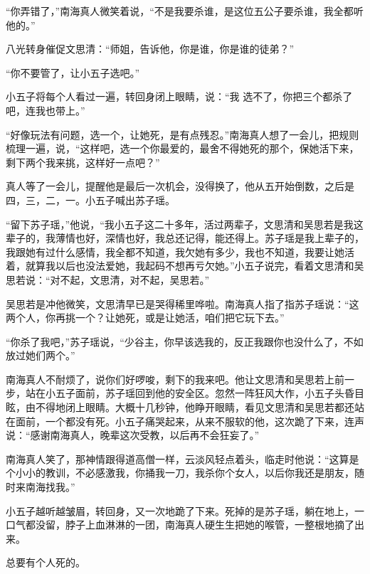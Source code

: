“你弄错了，”南海真人微笑着说，“不是我要杀谁，是这位五公子要杀谁，我全都听他的。”

八光转身催促文思清：“师姐，告诉他，你是谁，你是谁的徒弟？”

“你不要管了，让小五子选吧。”

小五子将每个人看过一遍，转回身闭上眼睛，说：“我
选不了，你把三个都杀了吧，连我也带上。”

“好像玩法有问题，选一个，让她死，是有点残忍。”南海真人想了一会儿，把规则梳理一遍，说，“这样吧，选一个你最爱的，最舍不得她死的那个，保她活下来，剩下两个我来挑，这样好一点吧？”

真人等了一会儿，提醒他是最后一次机会，没得换了，他从五开始倒数，之后是四，三，二，一。小五子喊出苏子瑶。

“留下苏子瑶，”他说，“我小五子这二十多年，活过两辈子，文思清和吴思若是我这辈子的，我薄情也好，深情也好，我总还记得，能还得上。苏子瑶是我上辈子的，我跟她有过什么感情，我全都不知道，我欠她有多少，我也不知道，我要让她活着，就算我以后也没法爱她，我起码不想再亏欠她。”小五子说完，看着文思清和吴思若说：“对不起，文思清，对不起，吴思若。”

吴思若是冲他微笑，文思清早已是哭得稀里哗啦。南海真人指了指苏子瑶说：“这两个人，你再挑一个？让她死，或是让她活，咱们把它玩下去。”

“你杀了我吧，”苏子瑶说，“少谷主，你早该选我的，反正我跟你也没什么了，不如放过她们两个。”

南海真人不耐烦了，说你们好啰唆，剩下的我来吧。他让文思清和吴思若上前一步，站在小五子面前，苏子瑶回到他的安全区。忽然一阵狂风大作，小五子头昏目眩，由不得地闭上眼睛。大概十几秒钟，他睁开眼睛，看见文思清和吴思若都还站在面前，一个都没有死。小五子痛哭起来，从来不服软的他，这次跪了下来，连声说：“感谢南海真人，晚辈这次受教，以后再不会狂妄了。”

南海真人笑了，那神情跟得道高僧一样，云淡风轻点着头，临走时他说：“这算是个小小的教训，不必感激我，你捅我一刀，我杀你个女人，以后你我还是朋友，随时来南海找我。”

小五子越听越皱眉，转回身，又一次地跪了下来。死掉的是苏子瑶，躺在地上，一口气都没留，脖子上血淋淋的一团，南海真人硬生生把她的喉管，一整根地摘了出来。

总要有个人死的。

\newpage